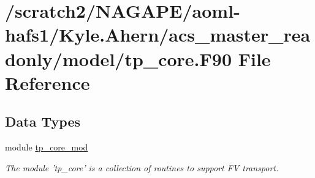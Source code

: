 \section{/scratch2/\-N\-A\-G\-A\-P\-E/aoml-\/hafs1/\-Kyle.Ahern/acs\-\_\-master\-\_\-readonly/model/tp\-\_\-core.F90 File Reference}
\label{tp__core_8F90}
\subsection*{Data Types}
\begin{DoxyCompactItemize}
\item 
module \hyperlink{classtp__core__mod}{tp\-\_\-core\-\_\-mod}
\begin{DoxyCompactList}\small\item\em The module 'tp\-\_\-core' is a collection of routines to support F\-V transport. \end{DoxyCompactList}\end{DoxyCompactItemize}
